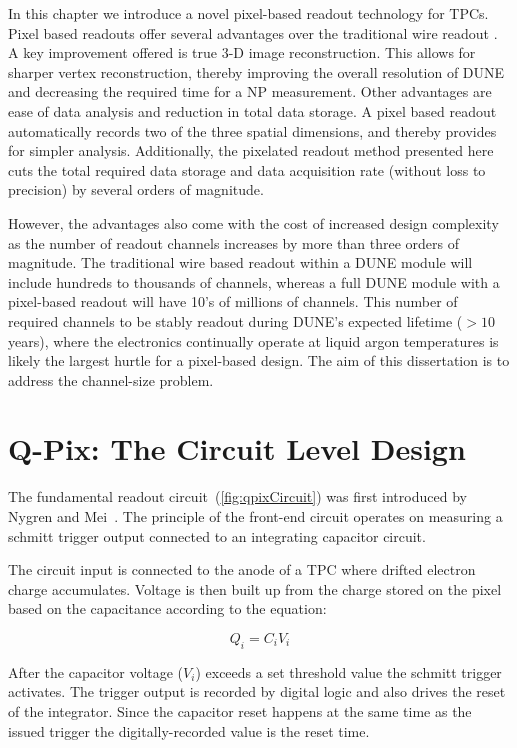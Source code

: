In this chapter we introduce a novel pixel-based readout technology for TPCs.
Pixel based readouts offer several advantages over the traditional wire readout \citep{lartpc_recon_problems_joshi_2015}.
A key improvement offered is true 3-D image reconstruction.
This allows for sharper vertex reconstruction, thereby improving the overall resolution of DUNE and decreasing the required time for a NP measurement.
Other advantages are ease of data analysis and reduction in total data storage.
A pixel based readout automatically records two of the three spatial dimensions, and thereby provides for simpler analysis.
Additionally, the pixelated readout method presented here cuts the total required data storage and data acquisition rate (without loss to precision) by several orders of magnitude.

However, the advantages also come with the cost of increased design complexity as the number of readout channels increases by more than three orders of magnitude. 
The traditional wire based readout within a DUNE module will include hundreds to thousands of channels, whereas a full DUNE module with a pixel-based readout will have 10's of millions of channels.
This number of required channels to be stably readout during DUNE's expected lifetime ($> 10$ years), where the electronics continually operate at liquid argon temperatures is likely the largest hurtle for a pixel-based design.
The aim of this dissertation is to address the channel-size problem.

\section{Q-Pix: The Circuit Level Design}

The fundamental readout circuit~(\ref{fig:qpixCircuit}) was first introduced by Nygren and Mei~\citep{qpix:nygren:mei}.
The principle of the front-end circuit operates on measuring a schmitt trigger output connected to an integrating capacitor circuit.

The circuit input is connected to the anode of a TPC where drifted electron charge accumulates.
Voltage is then built up from the charge stored on the pixel based on the capacitance according to the equation:

\begin{equation}
Q_{i} = C_{i}V_{i}
\end{equation}

After the capacitor voltage ($V_{i}$) exceeds a set threshold value the schmitt trigger activates.
The trigger output is recorded by digital logic and also drives the reset of the integrator.
Since the capacitor reset happens at the same time as the issued trigger the digitally-recorded value is the reset time.

